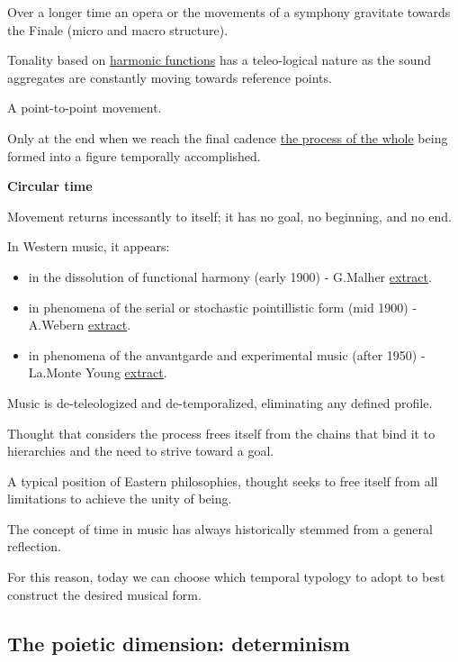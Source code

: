 Over a longer time an opera or the movements of a symphony gravitate towards the Finale (micro and macro structure).

Tonality based on \href{https://github.com/musicaecodice/EMC/blob/main/3_fixed/suoni/aggregati.mp3}{harmonic functions} has a teleo-logical nature as the sound aggregates are constantly moving towards reference points.

A point-to-point movement.

Only at the end when we reach the final cadence \href{https://github.com/musicaecodice/EMC/blob/main/3_fixed/suoni/forma1.mov}{the process of the whole} being formed into a figure temporally accomplished.

\textbf{Circular time}\label{circular-time}

Movement returns incessantly to itself; it has no goal, no beginning, and no end.

In Western music, it appears:

\begin{itemize}
\item in the dissolution of functional harmony (early 1900) - G.Malher \href{https://github.com/musicaecodice/EMC/blob/main/3_fixed/suoni/mal.mp3}{extract}.
\item in phenomena of the serial or stochastic pointillistic form (mid 1900) - A.Webern \href{https://github.com/musicaecodice/EMC/blob/main/3_fixed/suoni/web.mp3}{extract}.
\item in phenomena of the anvantgarde and experimental music (after 1950) - La.Monte Young \href{https://github.com/musicaecodice/EMC/blob/main/3_fixed/suoni/mont.mp3}{extract}.
\end{itemize}

Music is de-teleologized and de-temporalized, eliminating any defined profile.

Thought that considers the process frees itself from the chains that bind it to hierarchies and the need to strive toward a goal.

A typical position of Eastern philosophies, thought seeks to free itself from all limitations to achieve the unity of being.

The concept of time in music has always historically stemmed from a general reflection.

For this reason, today we can choose which temporal typology to adopt to best construct the desired musical form.

\subsection{The poietic dimension: determinism}\label{the-poietic-dimension-determinism}

